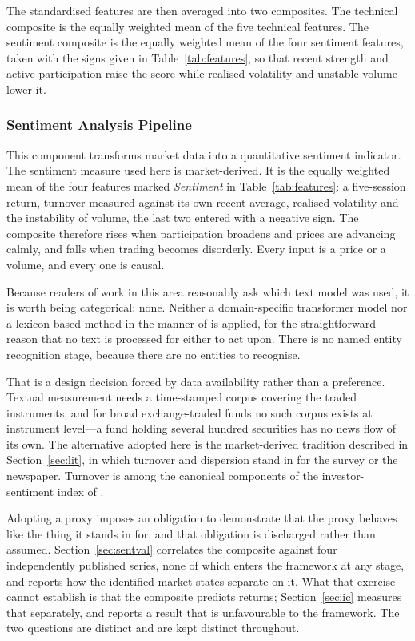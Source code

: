 \documentclass{singlecol-new}
\theoremstyle{TH}{
\newtheorem{lemma}{Lemma}
\newtheorem{theorem}[lemma]{Theorem}
\newtheorem{corrolary}[lemma]{Corrolary}
\newtheorem{conjecture}[lemma]{Conjecture}
\newtheorem{proposition}[lemma]{Proposition}
\newtheorem{claim}[lemma]{Claim}
\newtheorem{stheorem}[lemma]{Wrong Theorem}
\newtheorem{algorithm}{Algorithm}
}
\theoremstyle{THrm}{
\newtheorem{definition}{Definition}[section]
\newtheorem{question}{Question}[section]
\newtheorem{remark}{Remark}
\newtheorem{scheme}{Scheme}
}
\theoremstyle{THhit}{
\newtheorem{case}{Case}[section]
}
\begin{document}
The standardised features are then averaged into two composites. The technical composite
is the equally weighted mean of the five technical features. The sentiment composite is
the equally weighted mean of the four sentiment features, taken with the signs given in
Table~\ref{tab:features}, so that recent strength and active participation raise the
score while realised volatility and unstable volume lower it.

\subsubsection{Sentiment Analysis Pipeline}
\label{sec:sentiment}

This component transforms market data into a quantitative sentiment indicator. The
sentiment measure used here is market-derived. It is the equally weighted mean of the
four features marked \emph{Sentiment} in Table~\ref{tab:features}: a five-session return,
turnover measured against its own recent average, realised volatility and the instability
of volume, the last two entered with a negative sign. The composite therefore rises when
participation broadens and prices are advancing calmly, and falls when trading becomes
disorderly. Every input is a price or a volume, and every one is causal.

Because readers of work in this area reasonably ask which text model was used, it is
worth being categorical: none. Neither a domain-specific transformer model nor a
lexicon-based method in the manner of \citet{loughran11} is applied, for the
straightforward reason that no text is processed for either to act upon. There is no
named entity recognition stage, because there are no entities to recognise.

That is a design decision forced by data availability rather than a preference. Textual
measurement needs a time-stamped corpus covering the traded instruments, and for broad
exchange-traded funds no such corpus exists at instrument level---a fund holding several
hundred securities has no news flow of its own. The alternative adopted here is the
market-derived tradition described in Section~\ref{sec:lit}, in which turnover and
dispersion stand in for the survey or the newspaper. Turnover is among the canonical
components of the investor-sentiment index of \citet{bakerwurgler07}.

Adopting a proxy imposes an obligation to demonstrate that the proxy behaves like the
thing it stands in for, and that obligation is discharged rather than assumed.
Section~\ref{sec:sentval} correlates the composite against four independently published
series, none of which enters the framework at any stage, and reports how the identified
market states separate on it. What that exercise cannot establish is that the composite
predicts returns; Section~\ref{sec:ic} measures that separately, and reports a result
that is unfavourable to the framework. The two questions are distinct and are kept
distinct throughout.
\end{document}
